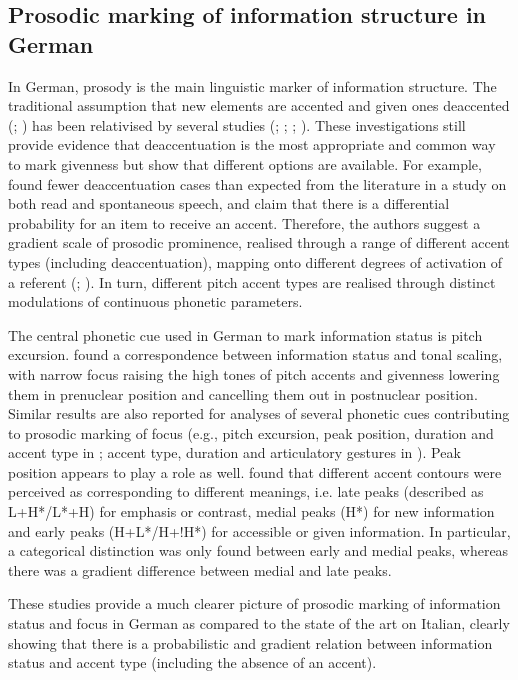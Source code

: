 \subsection{Prosodic marking of information structure in German}
\label{sec:2.1.5}
In German, prosody is the main linguistic marker of information structure. The traditional assumption that new elements are accented and given ones deaccented (\citealt{Allerton1978}; \citealt{Cruttenden2006}) has been relativised by several studies (\citealt{Baumann2005}; \citealt{BaumannHadelich2003}; \citealt{KüglerFéry2017}; \citealt{Wagner1999}). These investigations still provide evidence that deaccentuation is the most appropriate and common way to mark givenness but show that different options are available. For example, \citet{BaumannRiester2013} found fewer deaccentuation cases than expected from the literature in a study on both read and spontaneous speech, and claim that there is a differential probability for an item to receive an accent. Therefore, the authors suggest a gradient scale of prosodic prominence, realised through a range of different accent types (including deaccentuation), mapping onto different degrees of activation of a referent (\citealt{Baumann2006}; \citealt{BaumannRiester2013}). In turn, different pitch accent types are realised through distinct modulations of continuous phonetic parameters.

The central phonetic cue used in German to mark information status is pitch excursion. \citet{FéryKügler2008} found a correspondence between information status and tonal scaling, with narrow focus raising the high tones of pitch accents and givenness lowering them in prenuclear position and cancelling them out in postnuclear position. Similar results are also reported for analyses of several phonetic cues contributing to prosodic marking of focus (e.g., pitch excursion, peak position, duration and accent type in \citealt{BaumannEtAl2006}; accent type, duration and articulatory gestures in \citealt{HermesEtAl2008}). Peak position appears to play a role as well. \citet{Kohler1991} found that different accent contours were perceived as corresponding to different meanings, i.e. late peaks (described as L+H*/L*+H) for emphasis or contrast, medial peaks (H*) for new information and early peaks (H+L*/H+!H*) for accessible or given information. In particular, a categorical distinction was only found between early and medial peaks, whereas there was a gradient difference between medial and late peaks. 

These studies provide a much clearer picture of prosodic marking of information status and focus in German as compared to the state of the art on Italian, clearly showing that there is a probabilistic and gradient relation between information status and accent type (including the absence of an accent).

